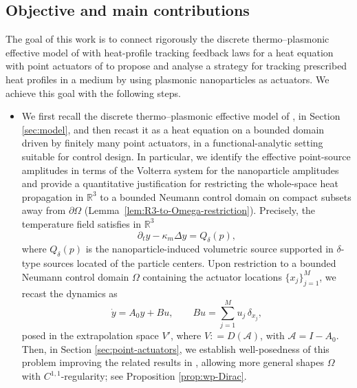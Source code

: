 \documentclass[11pt,a4paper]{article}
\numberwithin{equation}{section}
\theoremstyle{definition}
\newcommand{\R}{\mathbb{R}}
\newcommand{\1}{\mathbbm{1}}
\begin{document}
\subsection{Objective and main contributions}
\noindent
The goal of this work is to connect rigorously the discrete thermo--plasmonic
effective model of \cite{CaoMukherjeeSini2025} with heat-profile tracking
feedback laws for a heat equation with point actuators of \cite{KunRodWal24-cocv} to propose and analyse a strategy for tracking prescribed heat profiles in a medium by using plasmonic nanoparticles as actuators. We achieve this goal with the following steps. 
\begin{itemize}
\item[(i)] We first recall the discrete thermo--plasmonic
effective model of \cite{CaoMukherjeeSini2025}, in Section \ref{sec:model}, and then recast it  as a heat equation
on a bounded domain driven by finitely many point actuators, in a
functional-analytic setting suitable for control design. In particular, we
identify the effective point-source amplitudes in terms of the Volterra system
for the nanoparticle amplitudes and provide a quantitative justification for
restricting the whole-space heat propagation in $\R^3$ to a bounded Neumann
control domain on compact subsets away from $\partial\Omega$ (Lemma~\ref{lem:R3-to-Omega-restriction}). Precisely, the temperature field satisfies in $\R^3$
\[
\partial_t y-\kappa_m\Delta y = Q_\delta(p),
\]
where $Q_\delta(p)$ is the nanoparticle-induced volumetric source supported in $\delta$-type sources located of the particle centers. Upon restriction to a bounded Neumann control domain $\Omega$ containing the actuator locations $\{x_j\}_{j=1}^M$, we recast the dynamics as
\[
\dot y = A_0 y + Bu,
\qquad
Bu=\sum_{j=1}^M u_j\,\delta_{x_j},
\]
posed in the extrapolation space $V'$, where $V: =D(\mathcal A)$, with $\mathcal A=I-A_0$. Then, in Section \ref{sec:point-actuators}, we establish well-posedness of this problem improving the related results in \cite{KunRodWal24-cocv}, allowing more general shapes $\Omega$ with $C^{1,1}$-regularity; see Proposition \ref{prop:wp-Dirac}.





\end{itemize}
\end{document}
